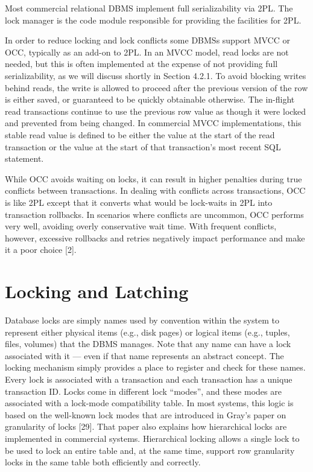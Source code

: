 \documentclass[b5paper,11pt,twoside,openright]{book}
\begin{document}
Most commercial relational DBMS implement full serializability via 2PL.
The lock manager is the code module responsible for providing the
facilities for 2PL.

In order to reduce locking and lock conflicts some DBMSs support MVCC
or OCC, typically as an add-on to 2PL. In an MVCC model, read locks are
not needed, but this is often implemented at the expense of not
providing full serializability, as we will discuss shortly in Section
4.2.1. To avoid blocking writes behind reads, the write is allowed to
proceed after the previous version of the row is either saved, or
guaranteed to be quickly obtainable otherwise. The in-flight read
transactions continue to use the previous row value as though it were
locked and prevented from being changed. In commercial MVCC
implementations, this stable read value is defined to be either the
value at the start of the read transaction or the value at the start of
that transaction's most recent SQL statement.

While OCC avoids waiting on locks, it can result in higher penalties
during true conflicts between transactions. In dealing with conflicts
across transactions, OCC is like 2PL except that it converts what would
be lock-waits in 2PL into transaction rollbacks. In scenarios where
conflicts are uncommon, OCC performs very well, avoiding overly
conservative wait time. With frequent conflicts, however, excessive
rollbacks and retries negatively impact performance and make it a poor
choice {[}2{]}.

\hypertarget{locking-and-latching}{%
\section{Locking and Latching}\label{locking-and-latching}}

Database locks are simply names used by convention within the system to
represent either physical items (e.g., disk pages) or logical items
(e.g., tuples, files, volumes) that the DBMS manages. Note that any name
can have a lock associated with it --- even if that name represents an
abstract concept. The locking mechanism simply provides a place to
register and check for these names. Every lock is associated with a
transaction and each transaction has a unique transaction ID. Locks come
in different lock ``modes'', and these modes are associated with a
lock-mode compatibility table. In most systems, this logic is based on
the well-known lock modes that are introduced in Gray's paper on
granularity of locks {[}29{]}. That paper also explains how hierarchical
locks are implemented in commercial systems. Hierarchical locking allows
a single lock to be used to lock an entire table and, at the same time,
support row granularity locks in the same table both efficiently and
correctly.
\end{document}
